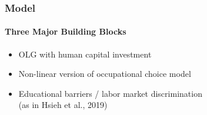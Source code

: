 \documentclass[11pt]{beamer}
\begin{document}
	
 \begin{frame}
		\frametitle{Model}
		\framesubtitle{Three Major Building Blocks}
		\begin{itemize}
			\item OLG with human capital investment
			\item Non-linear version of occupational choice model
			\item Educational barriers / labor market discrimination \\
			(as in Hsieh et al., 2019)
		\end{itemize}
	\end{frame}
	
\end{document}
